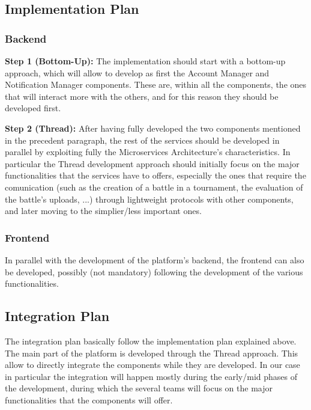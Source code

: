 \documentclass{article}
\begin{document}
{    \subsection{Implementation Plan}
        \subsubsection{Backend}
        \textbf{Step 1 (Bottom-Up):} The implementation should start with a bottom-up approach, which
        will allow to develop as first the Account Manager and Notification Manager components.
        These are, within all the components, the ones that will interact more with the others, and
        for this reason they should be developed first.
        
        \textbf{Step 2 (Thread):} After having fully developed the two components mentioned in the
        precedent paragraph, the rest of the services should be developed in parallel by exploiting 
        fully the Microservices Architecture's characteristics. In particular the Thread
        development approach should initially focus on the major functionalities that the services
        have to offers, especially the ones that require the comunication (such as the creation
        of a battle in a tournament, the evaluation of the battle's uploads, ...) through 
        lightweight protocols with other components, and later moving to the simplier/less 
        important ones.

        \subsubsection{Frontend}
        In parallel with the development of the platform's backend, the frontend can also be
        developed, possibly (not mandatory) following the development of the various 
        functionalities.    

    \subsection{Integration Plan}
        The integration plan basically follow the implementation plan explained above.
        The main part of the platform is developed through the Thread approach. This allow to
        directly integrate the components while they are developed.
        In our case in particular the integration will happen mostly during the early/mid phases
        of the development, during which the several teams will focus on the major functionalities
        that the components will offer.

}
\end{document}
